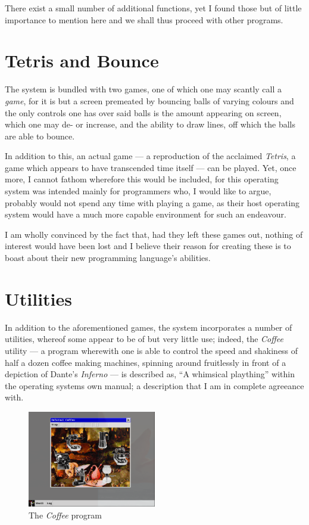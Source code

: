 \documentclass[a5paper,twoside,12pt]{report}
\begin{document}
  There exist a small number of additional functions, yet I found those but of little importance to mention here and we shall thus proceed with other programs.

  \section*{Tetris and Bounce}

  The system is bundled with two games, one of which one may scantly call a \textit{game}, for it is but a screen premeated by bouncing balls of varying colours and the only controls one has over said balls is the amount appearing on screen, which one may de- or increase, and the ability to draw lines, off which the balls are able to bounce.


  In addition to this, an actual game — a reproduction of the acclaimed \textit{Tetris}, a game which appears to have transcended time itself — can be played. Yet, once more, I cannot fathom wherefore this would be included, for this operating system was intended mainly for programmers who, I would like to argue, probably would not spend any time with playing a game, as their host operating system would have a much more capable environment for such an endeavour. 

  I am wholly convinced by the fact that, had they left these games out, nothing of interest would have been lost and I believe their reason for creating these is to boast about their new programming language's abilities.

  \section*{Utilities}

  In addition to the aforementioned games, the system incorporates a number of utilities, whereof some appear to be of but very little use; indeed, the \textit{Coffee} utility — a program wherewith one is able to control the speed and shakiness of half a dozen coffee making machines, spinning around fruitlessly in front of a depiction of Dante's \textit{Inferno} — is described as, ``A whimsical plaything'' within the operating systems own manual; a description that I am in complete agreeance with.

  \begin{figure}
    \centering
    \includegraphics[width=0.5\textwidth]{coffee.png}
    \caption{The \textit{Coffee} program}
  \end{figure}
\end{document}
